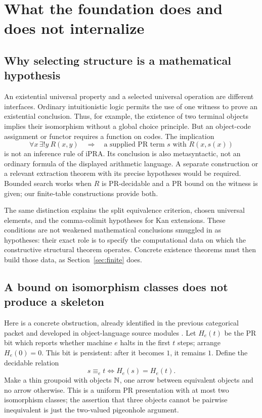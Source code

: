 \section{What the foundation does and does not internalize}\label{sec:boundaries}

\subsection{Why selecting structure is a mathematical hypothesis}
An existential universal property and a selected universal operation are
different interfaces. Ordinary intuitionistic logic permits the use of
one witness to prove an existential conclusion. Thus, for example, the
existence of two terminal objects implies their isomorphism without a
global choice principle. But an object-code assignment or functor requires
a function on codes. The implication
\[
  \forall x\,\exists!y\ R(x,y)
       \quad\Longrightarrow\quad
  \text{a supplied PR term }s\text{ with }R(x,s(x))
\]
is not an inference rule of iPRA. Its conclusion is also metasyntactic,
not an ordinary formula of the displayed arithmetic language. A separate
construction or a relevant extraction theorem with its precise hypotheses
would be required. Bounded search works when $R$ is PR-decidable and a PR
bound on the witness is given; our finite-table constructions provide both.

The same distinction explains the split equivalence criterion, chosen
universal elements, and the comma-colimit hypotheses for Kan extensions.
These conditions are not weakened mathematical conclusions smuggled in
as hypotheses: their exact role is to specify the computational data on
which the constructive structural theorem operates. Concrete existence
theorems must then build those data, as Section~\ref{sec:finite} does.

\subsection{A bound on isomorphism classes does not produce a skeleton}
Here is a concrete obstruction, already identified in the previous
categorical packet and developed in object-language source modules
\cite{repo-categorical,repo-two-class}. Let $H_e(t)$ be the PR bit which
reports whether machine $e$ halts in the first $t$ steps; arrange
$H_e(0)=0$. This bit is persistent: after it becomes $1$, it remains $1$.
Define the decidable relation
\[
                        s\equiv_e t\iff H_e(s)=H_e(t).
\]
Make a thin groupoid with objects $\mathbb{N}$, one arrow between equivalent
objects and no arrow otherwise. This is a uniform PR presentation with
at most two isomorphism classes; the assertion that three objects cannot
be pairwise inequivalent is just the two-valued pigeonhole argument.

